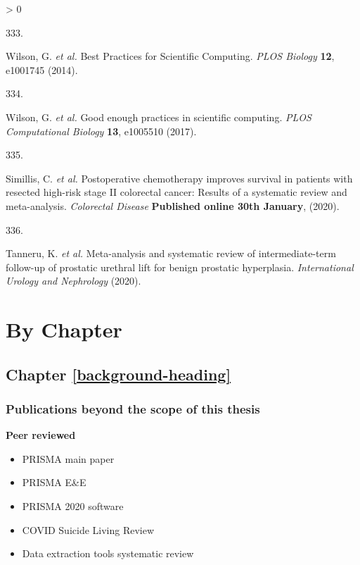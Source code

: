 \documentclass[a4paper, twoside]{templates/ociamthesis}
\newlength{\cslhangindent}
\newlength{\csllabelwidth}
\newenvironment{CSLReferences}[3] %
 {%
  \setlength{\parindent}{0pt}
  \ifodd #1 \everypar{\setlength{\hangindent}{\cslhangindent}}\ignorespaces\fi
  \ifnum #2 > 0
  \setlength{\parskip}{#2\baselineskip}
  \fi
 }%
 {}
\newcommand{\CSLLeftMargin}[1]{\parbox[t]{\maxof{\widthof{#1}}{\csllabelwidth}}{#1}}
\newcommand{\CSLRightInline}[1]{\parbox[t]{\linewidth - \csllabelwidth}{#1}}
\begin{document}
\begin{CSLReferences}{0}{0}
\leavevmode\hypertarget{ref-wilson2014}{}%
\CSLLeftMargin{333. }
\CSLRightInline{Wilson, G. \emph{et al.} Best {Practices} for {Scientific Computing}. \emph{PLOS Biology} \textbf{12}, e1001745 (2014).}

\leavevmode\hypertarget{ref-wilson2017}{}%
\CSLLeftMargin{334. }
\CSLRightInline{Wilson, G. \emph{et al.} Good enough practices in scientific computing. \emph{PLOS Computational Biology} \textbf{13}, e1005510 (2017).}

\leavevmode\hypertarget{ref-simillis2020}{}%
\CSLLeftMargin{335. }
\CSLRightInline{Simillis, C. \emph{et al.} Postoperative chemotherapy improves survival in patients with resected high-risk stage {II} colorectal cancer: Results of a systematic review and meta-analysis. \emph{Colorectal Disease} \textbf{Published online 30th January}, (2020).}

\leavevmode\hypertarget{ref-tanneru2020}{}%
\CSLLeftMargin{336. }
\CSLRightInline{Tanneru, K. \emph{et al.} Meta-analysis and systematic review of intermediate-term follow-up of prostatic urethral lift for benign prostatic hyperplasia. \emph{International Urology and Nephrology} (2020).}

\end{CSLReferences}

\startappendices

\hypertarget{chapter-appendix-heading}{%
\chapter{By Chapter}\label{chapter-appendix-heading}}

\hypertarget{appendix-into}{%
\section{Chapter \ref{background-heading}}\label{appendix-into}}

\hypertarget{appendix-publications}{%
\subsection{Publications beyond the scope of this thesis}\label{appendix-publications}}

\textbf{Peer reviewed}

\begin{itemize}
\item
  PRISMA main paper
\item
  PRISMA E\&E
\item
  PRISMA 2020 software
\item
  COVID Suicide Living Review
\item
  Data extraction tools systematic review
\end{itemize}
\end{document}
